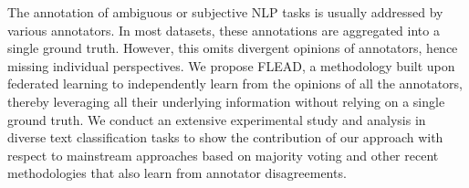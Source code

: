 The annotation of ambiguous or subjective NLP tasks is usually addressed by various annotators. In most datasets, these annotations are aggregated into a single ground truth. However, this omits divergent opinions of annotators, hence missing individual perspectives. We propose FLEAD, a methodology built upon federated learning to independently learn from the opinions of all the annotators, thereby leveraging all their underlying information without relying on a single ground truth. We conduct an extensive experimental study and analysis in diverse text classification tasks to show the contribution of our approach with respect to mainstream approaches based on majority voting and other recent methodologies that also learn from annotator disagreements.